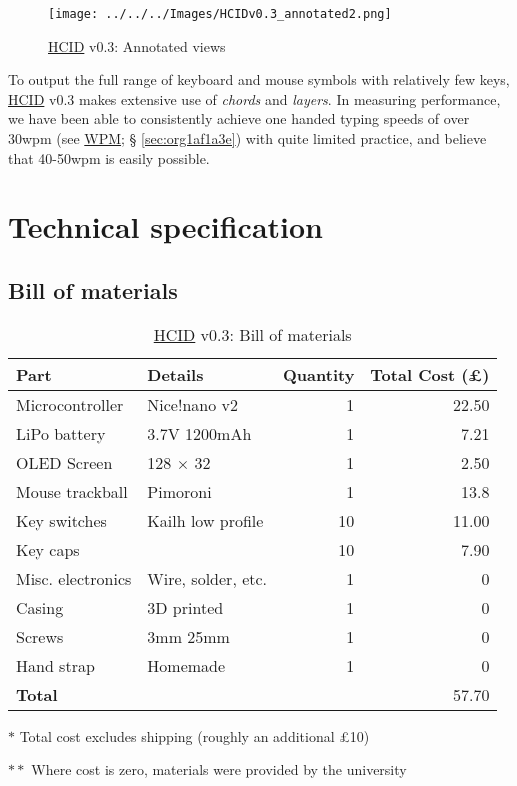 \documentclass[logo,bsc,singlespacing,parskip]{infthesis}
\begin{document}
\begin{figure}[h]
\centering
\texttt{[image: ../../../Images/HCIDv0.3\_annotated2.png]}
\caption{\hyperref[orgc00eca5]{HCID} v0.3: Annotated views}
\end{figure}

To output the full range of keyboard and mouse symbols with relatively few keys, \hyperref[orgc00eca5]{HCID} v0.3 makes extensive use of \emph{chords} and \emph{layers}. In measuring performance, we have been able to consistently achieve one handed typing speeds of over 30wpm (see \hyperref[sec:org1af1a3e]{WPM}; § \ref{sec:org1af1a3e}) with quite limited practice, and believe that 40-50wpm is easily possible.
\section{Technical specification}
\label{sec:orgf773765}
\subsection{Bill of materials}
\label{sec:org9908f6f}
\begin{table}
\begin{threeparttable}
\begin{tabular}{llrr}
\toprule
\textbf{Part} & \textbf{Details} & \textbf{Quantity} & \textbf{Total Cost (£)}\\
\midrule
Microcontroller & Nice!nano v2 \autocite{NiceNanoNice} & 1 & 22.50\\
LiPo battery & 3.7V 1200mAh \autocite{adafruitLiPo} & 1 & 7.21\\
OLED Screen & 128 \(\times\) 32 \autocite{128X32OLEDScreen} & 1 & 2.50\\
Mouse trackball & Pimoroni \autocite{TrackballBreakoutPimoroni} & 1 & 13.8\\
Key switches & Kailh low profile \autocite{Mechboards} & 10 & 11.00\\
Key caps & \autocite{Mechboards} & 10 & 7.90\\
Misc. electronics & Wire, solder, etc. & 1 & 0\\
Casing & 3D printed & 1 & 0\\
Screws & 3mm \texttimes{} 25mm & 1 & 0\\
Hand strap & Homemade & 1 & 0\\
\midrule
\textbf{Total} &  &  & 57.70\\
\bottomrule
\end{tabular}
\begin{tablenotes}
\item[] \(\ast\) Total cost excludes shipping (roughly an additional £10)
\item[] \(\ast \ast\) Where cost is zero, materials were provided by the university
\end{tablenotes}
\caption{\label{tab:bom}\hyperref[orgc00eca5]{HCID} v0.3: Bill of materials}
\end{threeparttable}
\end{table}
\end{document}
